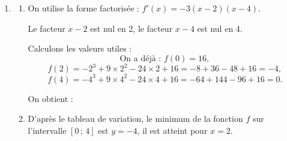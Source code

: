 \documentclass[10pt]{article}
\begin{document}
\begin{enumerate}
\item[]
\begin{enumerate}[start=4]
\item On utilise la forme factorisée : $f'(x)=-3(x-2)(x-4)$.

Le facteur $x-2$ est nul en 2, le facteur $x-4$ est nul en 4.

Calculons les valeurs utiles :
\[\text{On a déjà : } f(0)=16,\]
\[f(2)=-2^3+9\times 2^2-24\times 2+16=-8+36-48+16=-4,\]
\[f(4)=-4^3+9\times 4^2-24\times 4+16=-64+144-96+16=0.\]

On obtient :

\begin{center}
\end{center}

\item D'après le tableau de variation, le minimum de la fonction $f$ sur l'intervalle $[0\,;\,4]$ est $y=-4$, il est atteint pour $x=2$.

\end{enumerate}
\end{enumerate}
\end{document}
